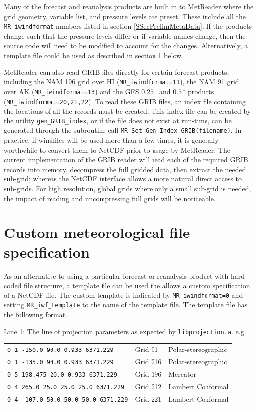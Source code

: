 \documentclass[11pt]{article}   %
\begin{document}
Many of the forecast and reanalysis products are built in to MetReader where the
grid geometry, variable list, and pressure levels are preset.  These include all
the \texttt{MR\_iwindformat} numbers listed in section \ref{SSecPrelimMetaData}.  If the
products change such that the pressure levels differ or if variable names change,
then the source code will need to be modified to account for the changes.
Alternatively, a template file could be used as described in section \ref{SecCust} below.

MetReader can also read GRIB files directly for certain forecast products, including the
NAM 196 grid over HI (\texttt{MR\_iwindformat=11}), the NAM 91 grid over AK
(\texttt{MR\_iwindformat=13}) and the GFS $0.25 \, ^{\circ}$ and $0.5 \, ^{\circ}$
products (\texttt{MR\_iwindformat=20,21,22}).  To read these GRIB files, an index
file containing the locations of all the records must be created.
This index file can be created 
by the utility \texttt{gen\_GRIB\_index}, or if the file does not exist at
run-time, can be generated through the subroutine call
\texttt{MR\_Set\_Gen\_Index\_GRIB(filename)}.  In practice, if windfiles will be used
more than a few times, it is generally worthwhile to convert them to NetCDF prior
to usage by MetReader.  The current
implementation of the GRIB reader will read each of the required GRIB records into
memory, decompress the full gridded data, then extract the needed sub-grid; whereas the 
NetCDF interface allows a more natural direct access to sub-grids.  For high resolution,
global grids where only a small sub-grid is needed, the impact of reading and uncompressing
full grids will be noticeable.

\section{Custom meteorological file specification}\label{SecCust}
As an alternative to using a particular forecast or reanalysis product with
hard-coded file structure, a template file can be used the allows a custom
specification of a NetCDF file.
The custom template is indicated by \texttt{MR\_iwindformat=0} and setting \texttt{MR\_iwf\_template}
to the name of the template file.  The template file has the following format.

Line 1: The line of projection parameters as expected by \texttt{libprojection.a}.
e.g.
\\
\begin{tabular}{ l  l  l }
\verb|0 1 -150.0 90.0 0.933 6371.229|     & Grid 91  & Polar-stereographic \\
\verb|0 1 -135.0 90.0 0.933 6371.229|     & Grid 216 & Polar-stereographic \\
\verb|0 5 198.475 20.0 0.933 6371.229|    & Grid 196 & Mercator \\
\verb|0 4 265.0 25.0 25.0 25.0 6371.229|  & Grid 212 & Lambert Conformal \\
\verb|0 4 -107.0 50.0 50.0 50.0 6371.229| & Grid 221 & Lambert Conformal \\
\end{tabular}
\end{document}
